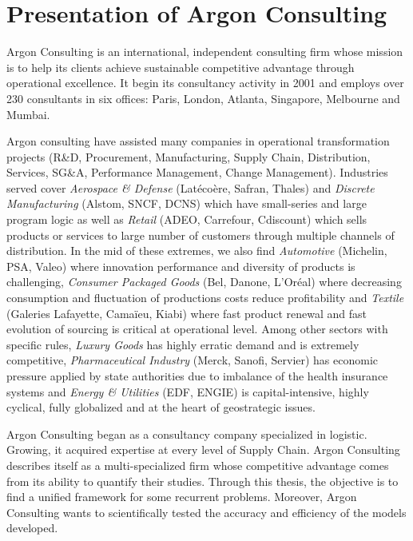 \section{Presentation of Argon Consulting}


Argon Consulting is an international, independent consulting firm whose mission is to help its clients achieve sustainable competitive advantage through operational excellence.
It begin its consultancy activity in 2001 and employs over 230 consultants in six offices: Paris, London, Atlanta, Singapore, Melbourne and Mumbai.


Argon consulting have assisted many companies in operational transformation projects (R\&D, Procurement, Manufacturing, Supply Chain, Distribution, Services, SG\&A, Performance Management, Change Management).
Industries served cover
\emph{Aerospace \& Defense} (Lat\'eco\`ere, Safran, Thales) and
\emph{Discrete Manufacturing} (Alstom, SNCF, DCNS) which have small-series and large program logic as well as
\emph{Retail} (ADEO, Carrefour, Cdiscount) which sells products or services to large number of customers through multiple channels of distribution.
In the mid of these extremes, we also find
\emph{Automotive} (Michelin, PSA, Valeo) where innovation performance and diversity of products is challenging,
\emph{Consumer Packaged Goods} (Bel, Danone, L'Oréal) where decreasing consumption and fluctuation of productions costs reduce profitability and
\emph{Textile} (Galeries Lafayette, Cama\"ieu, Kiabi) where fast product renewal and fast evolution of sourcing is critical at operational level.
Among other sectors with specific rules,
\emph{Luxury Goods} has highly erratic demand and is extremely competitive,
\emph{Pharmaceutical Industry} (Merck, Sanofi, Servier) has economic pressure applied by state authorities due to imbalance of the health insurance systems and
\emph{Energy \& Utilities} (EDF, ENGIE) is capital-intensive, highly cyclical, fully globalized and at the heart of geostrategic issues.


Argon Consulting began as a consultancy company specialized in logistic.
Growing, it acquired expertise at every level of Supply Chain.
Argon Consulting describes itself as a multi-specialized firm whose competitive advantage comes from its ability to quantify their studies.
Through this thesis, the objective is to find a unified framework for some recurrent problems.
Moreover, Argon Consulting wants to scientifically tested the accuracy and efficiency of the models developed.



